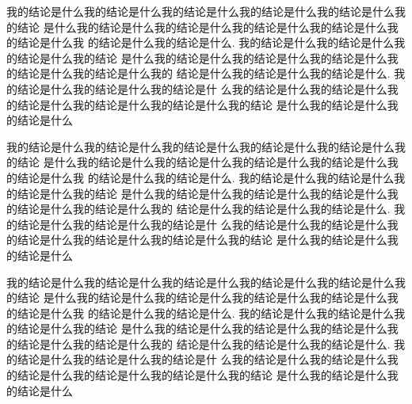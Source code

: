 \conclusion


我的结论是什么我的结论是什么我的结论是什么我的结论是什么我的结论是什么我的结论
是什么我的结论是什么我的结论是什么我的结论是什么我的结论是什么我的结论是什么我
的结论是什么我的结论是什么. 我的结论是什么我的结论是什么我的结论是什么我的结论
是什么我的结论是什么我的结论是什么我的结论是什么我的结论是什么我的结论是什么我的
结论是什么我的结论是什么我的结论是什么. 我的结论是什么我的结论是什么我的结论是什
么我的结论是什么我的结论是什么我的结论是什么我的结论是什么我的结论是什么我的结论
是什么我的结论是什么我的结论是什么

我的结论是什么我的结论是什么我的结论是什么我的结论是什么我的结论是什么我的结论
是什么我的结论是什么我的结论是什么我的结论是什么我的结论是什么我的结论是什么我
的结论是什么我的结论是什么. 我的结论是什么我的结论是什么我的结论是什么我的结论
是什么我的结论是什么我的结论是什么我的结论是什么我的结论是什么我的结论是什么我的
结论是什么我的结论是什么我的结论是什么. 我的结论是什么我的结论是什么我的结论是什
么我的结论是什么我的结论是什么我的结论是什么我的结论是什么我的结论是什么我的结论
是什么我的结论是什么我的结论是什么

我的结论是什么我的结论是什么我的结论是什么我的结论是什么我的结论是什么我的结论
是什么我的结论是什么我的结论是什么我的结论是什么我的结论是什么我的结论是什么我
的结论是什么我的结论是什么. 我的结论是什么我的结论是什么我的结论是什么我的结论
是什么我的结论是什么我的结论是什么我的结论是什么我的结论是什么我的结论是什么我的
结论是什么我的结论是什么我的结论是什么. 我的结论是什么我的结论是什么我的结论是什
么我的结论是什么我的结论是什么我的结论是什么我的结论是什么我的结论是什么我的结论
是什么我的结论是什么我的结论是什么

